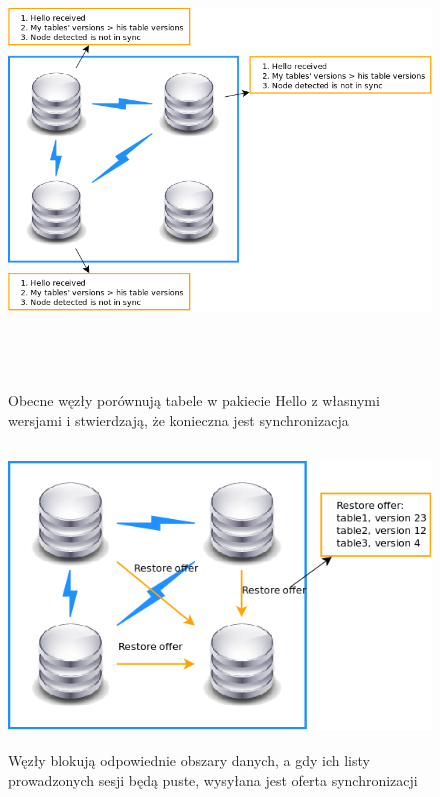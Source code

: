 \documentclass[a4paper, oneside, 11pt]{report}
\begin{document}
\begin{figure}[h]
\centering
\includegraphics[height=12cm]{restore_node_not_in_sync.png}
\caption{Obecne węzły porównują tabele w pakiecie Hello z własnymi wersjami i stwierdzają, że konieczna jest synchronizacja}
\end{figure}

\begin{figure}[h]
\centering
\includegraphics[height=8cm]{restore_restore_offer.png}
\caption{Węzły blokują odpowiednie obszary danych, a gdy ich listy prowadzonych sesji będą puste, wysyłana jest oferta synchronizacji}
\end{figure}
\end{document}
